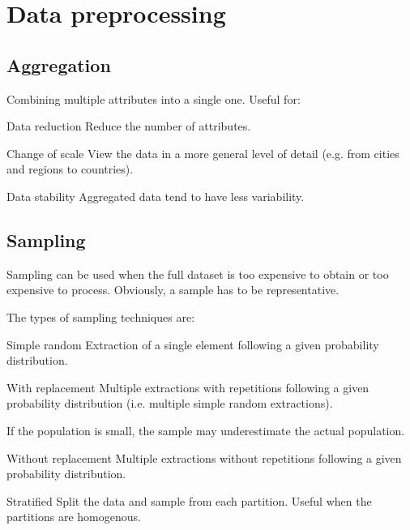 \chapter{Data preprocessing}

\section{Aggregation}

Combining multiple attributes into a single one.
Useful for:
\begin{descriptionlist}
    \item[Data reduction]
        Reduce the number of attributes.

    \item[Change of scale] 
        View the data in a more general level of detail (e.g. from cities and regions to countries).

    \item[Data stability] 
        Aggregated data tend to have less variability.
\end{descriptionlist}



\section{Sampling}
Sampling can be used when the full dataset is too expensive to obtain or too expensive to process.
Obviously, a sample has to be representative.

The types of sampling techniques are:
\begin{descriptionlist}
    \item[Simple random] 
        Extraction of a single element following a given probability distribution.
    
    \item[With replacement] 
        Multiple extractions with repetitions following a given probability distribution
        (i.e. multiple simple random extractions).

        If the population is small, the sample may underestimate the actual population.

    \item[Without replacement] 
        Multiple extractions without repetitions following a given probability distribution.

    \item[Stratified] 
        Split the data and sample from each partition.
        Useful when the partitions are homogenous.
\end{descriptionlist}


